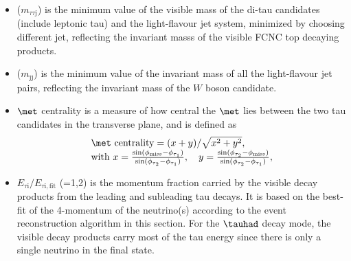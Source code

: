 \begin{itemize}
\item {}($m_{\tau\tau \text{j}}$) is the minimum value of the visible mass of the di-tau candidates (include leptonic tau) and the light-flavour jet system, minimized by choosing different jet, reflecting the invariant masss of the visible FCNC top decaying products.
\item {}($m_{\text{jj}}$) is the minimum value of the invariant mass of all the light-flavour jet pairs, reflecting the invariant mass of the $W$ boson candidate.
\item $\met$ centrality is a measure of how central the $\met$ lies between the two tau candidates in the transverse plane, and is defined as
\begin{eqnarray}
\begin{array}{l}
\met~\text{centrality} = {(x+y)}/{\sqrt{x^2+y^2}}, \\
\text{with}~x=\frac{\sin(\phi_{\text{miss}}-\phi_{\tau_1})}{\sin(\phi_{\tau_2}-\phi_{\tau_1})}, \quad  y=\frac{\sin(\phi_{\tau_2}-\phi_{\text{miss}})}{\sin(\phi_{\tau_2}-\phi_{\tau_1})} ,
\end{array}
\label{eq:eq3}
\end{eqnarray}
\item $E_{\tau\text{i}}/E_{\tau\text{i},\text{fit}}$ (=1,2) is the momentum fraction carried by the visible decay products from the leading and subleading tau decays. It is based on the best-fit of the 4-momentum of the neutrino(s) according to the event reconstruction algorithm in this section. For the $\tauhad$ decay mode, the visible decay products carry most of the tau energy since there is only a single neutrino in the final state.%

\end{itemize}
